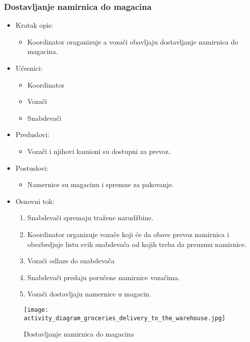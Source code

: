 \subsubsection{Dostavljanje namirnica do magacina}

\begin{itemize}
	\item Kratak opis:
		\begin{itemize}
			\item Koordinator oraganizuje a vozači obavljaju dostavljanje namirnica do magacina. 
		\end{itemize}
	\item Učesnici:
		\begin{itemize}
		    \item Koordinator
		    \item Vozači
		    \item Snabdevači
		\end{itemize}
	\item Preduslovi:
		\begin{itemize}
		   
		    \item Vozači i njihovi kamioni su dostupni za prevoz.
		\end{itemize}
	\item Postuslovi:
		\begin{itemize}
			\item Namernice su magacinu i spremne za pakovanje.
	\end{itemize}
	\item Osnovni tok:
		\begin{enumerate}
		 \item Snabdevači spremaju tražene narudžbine.
		\item Koordinator organizuje vozače koji će da obave prevoz namirnica i obezbedjuje listu svih snabdevača od kojih treba da preuzmu namirnice.
            \item Vozači odlaze do snabdevača
            \item Snabdevači predaju poručene namirnice vozačima.
            \item Vozači dostavljaju namernice u magacin.
   
		\end{enumerate}
\end{itemize}
\begin{figure}[H]
\begin{center}
\texttt{[image: activity\_diagram\_groceries\_delivery\_to\_the\_warehouse.jpg]}
\end{center}
    \caption{Dostavljanje namirnica do magacina}
\label{fig:Activity_diagram_groceries_delivery_to_the_warehouse}
\end{figure}